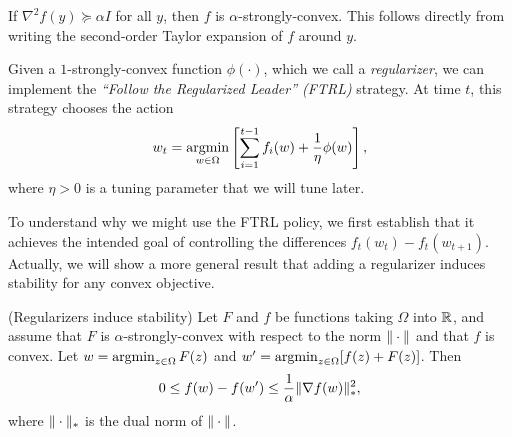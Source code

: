 \begin{remark}
If $\nabla^2 f(y) \succeq \alpha I$ for all $y$, then $f$ is $\alpha$-strongly-convex. This follows directly from writing the second-order Taylor expansion of $f$ around $y$.
\end{remark}

Given a $1$-strongly-convex function $\phi(\cdot)$, which we call a \textit{regularizer}, we can implement the \textit{``Follow the Regularized Leader'' (FTRL)} strategy.  At time $t$, this strategy chooses the action
\begin{align}
w_t = \operatorname*{\textup{argmin}}_{w \in \Omega} \left[ \sum_{i = 1}^{t -1} f_i(w) + \frac{1}{\eta} \phi(w) \right], \label{lec16:eqn:ftrl}
\end{align}
where $\eta > 0$ is a tuning parameter that we will tune later.


To understand why we might use the FTRL policy, we first establish that it achieves the intended goal of controlling the differences $f_t(w_t) - f_t(w_{t+1})$. Actually, we will show a more general result that adding a regularizer induces stability for any convex objective.

\begin{lemma}
\label{lec16:lem:regularizers_stability}
\textup{(Regularizers induce stability)} Let $F$ and $f$ be functions taking $\Omega$ into $\mathbb R$, and assume that $F$ is $\alpha$-strongly-convex with respect to the norm $\|\cdot\|$ and that $f$ is convex.  Let $w = \operatorname*{\textup{argmin}}_{z \in \Omega} F(z)$ and $w' = \operatorname*{\textup{argmin}}_{z \in \Omega} [f(z) + F(z)]$.  Then
\begin{equation}\label{lec16:eqn:regularizers_stability}
0 \leq f(w) - f(w') \leq \frac{1}{\alpha} \|\nabla f(w)\|_*^2,
\end{equation}
where $\|\cdot\|_*$ is the dual norm of $\|\cdot\|$.
\end{lemma}

